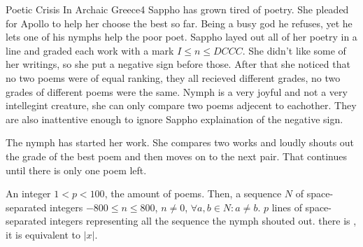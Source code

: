\begin{task}{Poetic Crisis In Archaic Greece}{4}
Sappho has grown tired of poetry. She pleaded for Apollo to help her choose
the best so far. Being a busy god he refuses, yet he lets one of his nymphs
help the poor poet. Sappho layed out all of her poetry in a line and graded each
work with a mark $I \leq n \leq DCCC$. She didn't like some of her writings, so she
put a negative sign before those. After that she noticed that no two poems were
of equal ranking, they all recieved different grades, no two grades of different
poems were the same.
Nymph is a very joyful and not a very intellegint creature, she can only compare
two poems adjecent to eachother. They are also
inattentive enough to ignore Sappho explaination of the negative sign.

The nymph has started her work. She compares two works and loudly shouts
out the grade of the best poem and then moves on to the next pair. That continues
until there is only one poem left.

\In
An integer $1 < p < 100$, the amount of poems. 
Then, a sequence $N$ of space-separated integers $-800 \leq n \leq 800$, 
$n \neq 0$, $\forall a, b \in N : a \neq b$.
\Out
$p$ lines of space-separated integers representing all the sequence the nymph shouted out.
\Hint there is , it is equivalent to $|x|$.

\begin{ExampleIO}
\end{ExampleIO}
\end{task}
